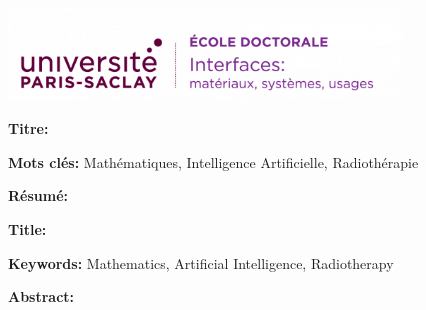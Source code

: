 \thispagestyle{empty}

\noindent 
\includegraphics[height=2.45cm]{preamble/ed-interfaces.png}
\vspace{1cm}

\small

\begin{mdframed}[linecolor=Prune,linewidth=1]
	
	\textbf{Titre:} \frenchtitle
	
	\vspace{1mm} \noindent
	\textbf{Mots clés:} Mathématiques, Intelligence Artificielle, Radiothérapie
	
	\begin{multicols}{2}
		\noindent \textbf{Résumé:}
		\lipsum[1-2]
		
	\end{multicols}
	
\end{mdframed}

\vspace{8mm}

\begin{mdframed}[linecolor=Prune,linewidth=1]
	
	\textbf{Title:} \englishtitle
	
	\vspace{1mm} \noindent
	\textbf{Keywords:} Mathematics, Artificial Intelligence, Radiotherapy
	
	\begin{multicols}{2}
		\noindent \textbf{Abstract:} 
		\lipsum[1-2]
		
	\end{multicols}
\end{mdframed}



